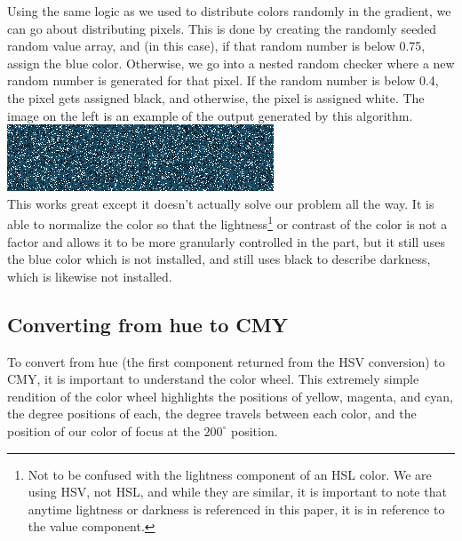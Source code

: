 \documentclass{article}
\begin{document}
\begin{multicols}{2}
\begin{tikzpicture}[x=0.75pt,y=0.75pt,yscale=-1.5,xscale=3.25]
\end{tikzpicture}

\noindent
Using the same logic as we used to distribute colors randomly in the gradient, we can go about distributing pixels. This is done by creating the randomly seeded random value array, and (in this case), if that random number is below 0.75, assign the blue color. Otherwise, we go into a nested random checker where a new random number is generated for that pixel. If the random number is below 0.4, the pixel gets assigned black, and otherwise, the pixel is assigned white. The image on the left is an example of the output generated by this algorithm.
\\


\noindent
\includegraphics[width=\columnwidth]{objective-color-hsv-no-color-seperation}
\\

\noindent
This works great except it doesn't actually solve our problem all the way. It is able to normalize the color so that the lightness\footnote{Not to be confused with the lightness component of an HSL color. We are using HSV, not HSL, and while they are similar, it is important to note that anytime lightness or darkness is referenced in this paper, it is in reference to the value component.} or contrast of the color is not a factor and allows it to be more granularly controlled in the part, but it still uses the blue color which is not installed, and still uses black to describe darkness, which is likewise not installed. 

\subsection{Converting from hue to CMY}

To convert from hue (the first component returned from the HSV conversion) to CMY, it is important to understand the color wheel. This extremely simple rendition of the color wheel highlights the positions of yellow, magenta, and cyan, the degree positions of each, the degree travels between each color, and the position of our color of focus at the $200^\circ$ position. 
\\


\end{multicols}
\end{document}
